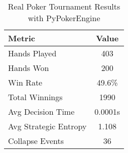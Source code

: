 \begin{table}[h]
\centering
\caption{Real Poker Tournament Results with PyPokerEngine}
\begin{tabular}{|l|c|}
\hline
Metric & Value \\
\hline
Hands Played & 403 \\
Hands Won & 200 \\
Win Rate & 49.6\% \\
Total Winnings & 1990 \\
Avg Decision Time & 0.0001s \\
Avg Strategic Entropy & 1.108 \\
Collapse Events & 36 \\
\hline
\end{tabular}
\end{table}